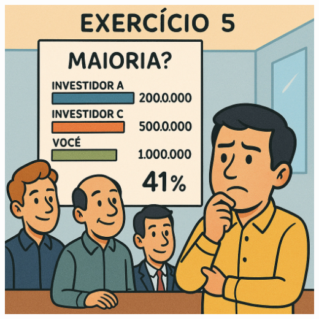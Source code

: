 \documentclass[
]{book}
\begin{document}
\includegraphics[width=6.94792in,height=\textheight]{images/03-2025-08-19_20/exercicio-05.jpg}
\end{document}
